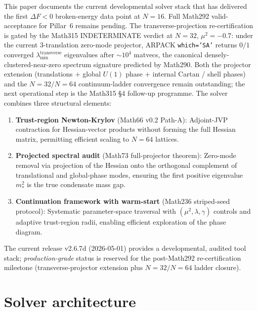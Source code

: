 This paper documents the current developmental solver stack that has
delivered the first $\Delta F<0$ broken-energy data point at $N=16$.
Full Math292 valid-acceptance for Pillar~6 remains pending. The
transverse-projection re-certification is gated by the Math315
INDETERMINATE verdict at $N=32$, $\mu^2=-0.7$: under the current
3-translation zero-mode projector, ARPACK \texttt{which='SA'}
returns $0/1$ converged $\lambda_{\min}^{\mathrm{transverse}}$
eigenvalues after $\sim 10^{4}$ matvecs, the canonical
densely-clustered-near-zero spectrum signature predicted by Math290.
Both the projector extension (translations $+$ global $U(1)$ phase
$+$ internal Cartan / shell phases) and the $N=32/N=64$
continuum-ladder convergence remain outstanding; the next
operational step is the Math315 \S 4 follow-up programme.
The solver combines three structural elements:
\begin{enumerate}
\item \textbf{Trust-region Newton-Krylov} (Math66 v0.2 Path-A):
Adjoint-JVP contraction for Hessian-vector products without forming
the full Hessian matrix, permitting efficient scaling to $N = 64$
lattices.

\item \textbf{Projected spectral audit} (Math73 full-projector
theorem): Zero-mode removal via projection of the Hessian onto the
orthogonal complement of translational and global-phase modes,
ensuring the first positive eigenvalue $m_*^2$ is the true condensate
mass gap.

\item \textbf{Continuation framework with warm-start} (Math236
striped-seed protocol): Systematic parameter-space traversal with
$(\mu^2, \lambda, \gamma)$ controls and adaptive trust-region radii,
enabling efficient exploration of the phase diagram.
\end{enumerate}

The current release v2.6.7d (2026-05-01) provides a developmental,
audited tool stack; \emph{production-grade} status is reserved for the
post-Math292 re-certification milestone (transverse-projector extension
plus $N=32/N=64$ ladder closure).

\section{Solver architecture}

